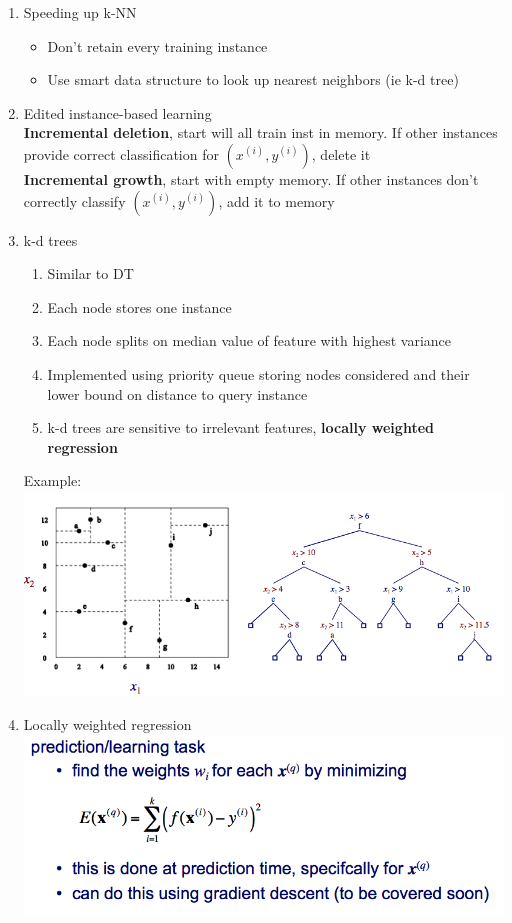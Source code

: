 \documentclass[a4paper]{article}
\begin{document}
\begin{enumerate}
\item Speeding up k-NN
  \begin{itemize}
  \item Don't retain every training instance
  \item Use smart data structure to look up nearest neighbors (ie k-d
    tree)
  \end{itemize}

\item Edited instance-based learning \\
  \textbf{Incremental deletion}, start will all train inst in memory. If other
  instances provide correct classification for $(x^{(i)},y^{(i)})$,
  delete it \\
  \textbf{Incremental growth}, start with empty memory. If other instances
  don't correctly classify $(x^{(i)},y^{(i)})$, add it to memory

\item k-d trees
  \begin{enumerate}
  \item Similar to DT
  \item Each node stores one instance
  \item Each node splits on median value of feature with highest
    variance
  \item Implemented using priority queue storing nodes considered and
    their lower bound on distance to query instance
  \item k-d trees are sensitive to irrelevant features, \textbf{locally
    weighted regression}
  \end{enumerate}
  Example: \\
  \includegraphics{kd}
  
\item Locally weighted regression \\
  \includegraphics[scale=0.5]{lwr}


\end{enumerate}
\end{document}
